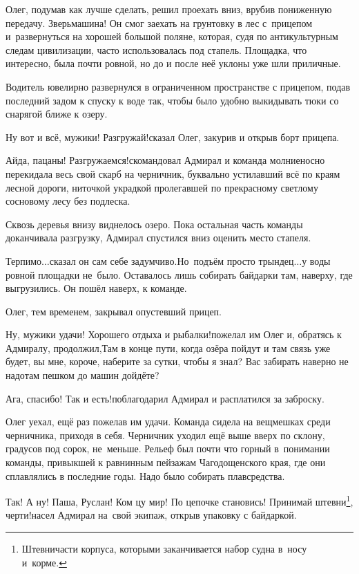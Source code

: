 Олег, подумав как лучше сделать, решил проехать вниз, врубив пониженную передачу. Зверь\nobreakdash\sdash\nobreakdash машина! Он смог заехать на грунтовку в лес с~прицепом и~развернуться на хорошей большой поляне, которая, судя по антикультурным следам цивилизации, часто использовалась под стапель. Площадка, что интересно, была почти ровной, но до и после неё уклоны уже шли приличные.

Водитель ювелирно развернулся в ограниченном пространстве с прицепом, подав последний задом к спуску к воде так, чтобы было удобно выкидывать тюки со снарягой ближе к озеру.

\diagdash Ну вот и всё, мужики! Разгружай!\mdash сказал Олег, закурив и открыв борт прицепа.

\diagdash Айда, пацаны! Разгружаемся!\mdash скомандовал Адмирал и команда молниеносно перекидала весь свой скарб на черничник, буквально устилавший всё по краям лесной дороги, ниточкой украдкой пролегавшей по прекрасному светлому сосновому лесу без подлеска. 

Сквозь деревья внизу виднелось озеро. Пока остальная часть команды доканчивала разгрузку, Адмирал спустился вниз оценить место стапеля. 

\diagdash Терпимо$\ldots$\mdash сказал он сам себе задумчиво.\mdash Но~подъём просто трындец$\ldots$\mdash у воды ровной площадки не~было. Оставалось лишь собирать байдарки там, наверху, где выгрузились. Он пошёл наверх, к команде.

Олег, тем временем, закрывал опустевший прицеп.

\diagdash Ну, мужики удачи! Хорошего отдыха и рыбалки!\mdash пожелал им Олег и, обратясь к Адмиралу, продолжил,\mdash Там в конце пути, когда озёра пойдут и там связь уже будет, вы мне, короче, наберите за сутки, чтобы я знал? Вас забирать наверно не надо\mdash там пешком до машин дойдёте?

\diagdash Ага, спасибо! Так и есть!\mdash поблагодарил Адмирал и расплатился за заброску.

Олег уехал, ещё раз пожелав им удачи. Команда сидела на вещмешках среди черничника, приходя в себя. Черничник уходил ещё выше вверх по склону, градусов под сорок, не~меньше. Рельеф был почти что горный в~понимании команды, привыкшей к равнинным пейзажам Чагодощенского края, где они сплавлялись в последние годы. Надо было собирать плавсредства.

\diagdash Так! А ну! Паша, Руслан! Ком цу мир! По цепочке становись! Принимай штевни\footnote{Штевни\mdash части корпуса, которыми заканчивается набор судна в~носу и~корме.}, черти!\mdash насел Адмирал на~свой экипаж, открыв упаковку с байдаркой.

